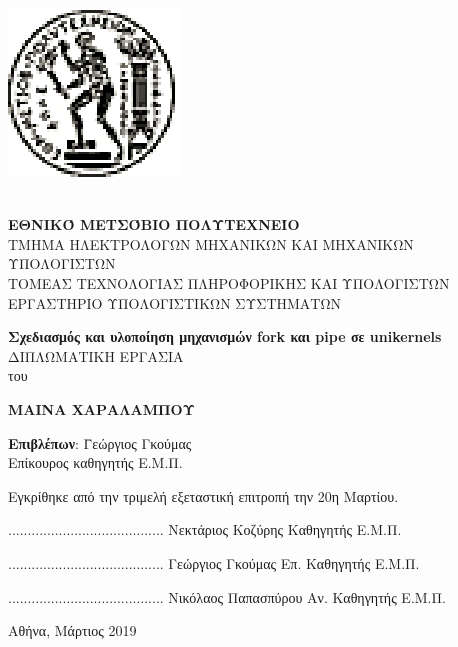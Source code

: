 \documentclass[12pt, twoside, a4paper]{report}
\begin{document}
\newpage
\thispagestyle{empty}
\hspace{10pt}
\newpage
\thispagestyle{empty}
\includegraphics[scale=1.5]{figures/pyrforos.eps}
\noindent
\parbox[b]{0.7\textwidth} {\textbf{
\noindent
\\
\normalsize{ΕΘΝΙΚΌ}
\normalsize{ΜΕΤΣΌΒΙΟ}
\normalsize{ΠΟΛΥΤΕΧΝΕΊΟ}} \\
\small
TMHMA
ΗΛΕΚΤΡΟΛΟΓΩΝ
ΜΗΧΑΝΙΚΩΝ
ΚΑΙ
ΜΗΧΑΝΙΚΩΝ
ΥΠΟΛΟΓΙΣΤΩΝ \\
ΤΟΜΕΑΣ ΤΕΧΝΟΛΟΓΙΑΣ ΠΛΗΡΟΦΟΡΙΚΗΣ ΚΑΙ ΥΠΟΛΟΓΙΣΤΩΝ \\
ΕΡΓΑΣΤΗΡΙΟ ΥΠΟΛΟΓΙΣΤΙΚΩΝ ΣΥΣΤΗΜΑΤΩΝ \\
}

\begin{center}
\vspace{7ex}
\large \textbf{Σχεδιασμός και υλοποίηση μηχανισμών fork και pipe σε unikernels} \\
\vspace{8ex}
\large
ΔΙΠΛΩΜΑΤΙΚΗ ΕΡΓΑΣΙΑ\\
\vspace{2ex}
\normalsize
του \\
\vspace{2ex}
\parbox[c]{0.4\textwidth} { \center\textbf{
ΜΑΙΝΑ ΧΑΡΑΛΑΜΠΟΥ }}
\vspace{10ex}
\begin{tabbing}
	\textbf{Επιβλέπων}: \= Γεώργιος Γκούμας \\
			    \> Επίκουρος καθηγητής Ε.Μ.Π.
\end{tabbing}
\end{center}

\noindent
Εγκρίθηκε από την τριμελή εξεταστική επιτροπή την 20η Μαρτίου.

\begin{center}
\scriptsize
\parbox[b]{0.3\textwidth} {\center
	........................................
	Νεκτάριος Κοζύρης
	Καθηγητής Ε.Μ.Π.
}
\parbox[b]{0.3\textwidth} {\center
	........................................
	Γεώργιος Γκούμας
	Επ. Καθηγητής Ε.Μ.Π.
}
\parbox[b]{0.3\textwidth} {\center
	........................................
	Νικόλαος Παπασπύρου
	Αν. Καθηγητής Ε.Μ.Π.
}
\end{center}
\vspace{10ex}
\begin{center}
\normalsize
Αθήνα, Μάρτιος 2019
\end{center}
\newpage
\thispagestyle{empty}
\hspace{10pt}
\end{document}
